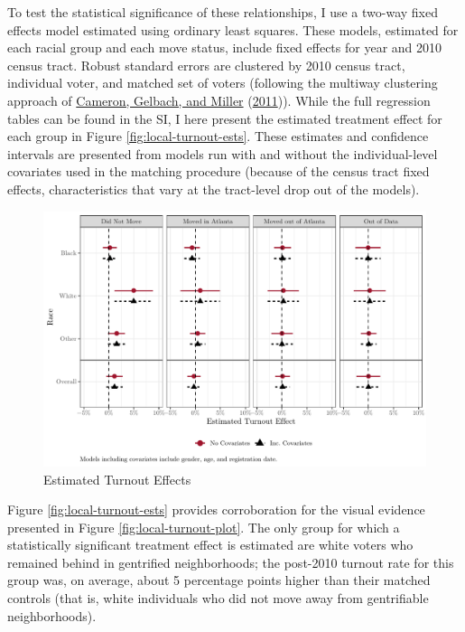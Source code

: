 \documentclass[
  12pt,
]{article}
\begin{document}
To test the statistical significance of these relationships, I use a two-way fixed effects model estimated using ordinary least squares. These models, estimated for each racial group and each move status, include fixed effects for year and 2010 census tract. Robust standard errors are clustered by 2010 census tract, individual voter, and matched set of voters (following the multiway clustering approach of \protect\hyperlink{ref-Cameron2011}{Cameron, Gelbach, and Miller} (\protect\hyperlink{ref-Cameron2011}{2011})). While the full regression tables can be found in the SI, I here present the estimated treatment effect for each group in Figure \ref{fig:local-turnout-ests}. These estimates and confidence intervals are presented from models run with and without the individual-level covariates used in the matching procedure (because of the census tract fixed effects, characteristics that vary at the tract-level drop out of the models).

\begin{figure}[H]

{\centering \includegraphics{gentrification_files/figure-latex/to-2-1} 

}

\caption{\label{fig:local-turnout-ests}Estimated Turnout Effects}\label{fig:to-2}
\end{figure}

Figure \ref{fig:local-turnout-ests} provides corroboration for the visual evidence presented in Figure \ref{fig:local-turnout-plot}. The only group for which a statistically significant treatment effect is estimated are white voters who remained behind in gentrified neighborhoods; the post-2010 turnout rate for this group was, on average, about 5 percentage points higher than their matched controls (that is, white individuals who did not move away from gentrifiable neighborhoods).
\end{document}
